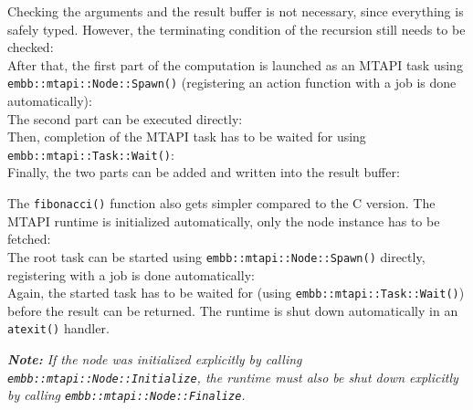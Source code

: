 Checking the arguments and the result buffer is not necessary, since everything is safely typed. However, the terminating condition of the recursion still needs to be checked:
%
\\
%
After that, the first part of the computation is launched as an MTAPI task using \lstinline|embb::mtapi::Node::Spawn()| (registering an action function with a job is done automatically):
%
\\
%
The second part can be executed directly:
%
\\
%
Then, completion of the MTAPI task has to be waited for using \lstinline|embb::mtapi::Task::Wait()|:
%
\\
%
Finally, the two parts can be added and written into the result buffer:
%
\\
% 

The \lstinline|fibonacci()| function also gets simpler compared to the C version. The MTAPI runtime is initialized automatically, only the node instance has to be fetched:
%
\\
%
The root task can be started using \lstinline|embb::mtapi::Node::Spawn()| directly, registering with a job is done automatically:
%
\\
%
Again, the started task has to be waited for (using \lstinline|embb::mtapi::Task::Wait()|) before the result can be returned. The runtime is shut down automatically in an \lstinline|atexit()| handler.

\emph{\textbf{Note:} If the node was initialized explicitly by calling \lstinline|embb::mtapi::Node::Initialize|, the runtime must also be shut down explicitly by calling \lstinline|embb::mtapi::Node::Finalize|.}

